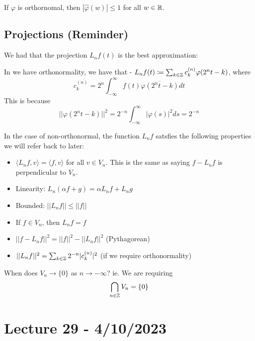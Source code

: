 \documentclass{article}
\begin{document}
{\begin{corollary}
    If $\varphi$ is orthornomal, then $|\widehat{\varphi}(w)| \leq 1$ for all $w \in \mathbb{R}$.
\end{corollary}

\subsection{Projections (Reminder)}

We had that the projection $L_n f(t)$ is the best approximation:

In we have orthonormality, we have that - $L_n f(t) \coloneqq \sum_{k \in \mathbb{Z}} c_k^{(n)} \varphi(2^n t - k)$, where
\[c_k^{(n)} = 2^n \int_{-\infty}^{\infty} f(t) \overline{\varphi(2^n t - k)} dt\]
This is because
\[||\varphi(2^n t - k)||^2 = 2^{-n} \int_{-\infty}^{\infty} |\varphi(s)|^2 ds = 2^{-n}\]

In the case of non-orthonormal, the function $L_n f$ satsfies the following properties we will refer back to later:
\begin{itemize}
    \item $\langle L_n f, v \rangle = \langle f, v \rangle$ for all $v \in V_n$. This is the same as saying $f - L_n f$ is perpendicular to $V_n$.
    \item Linearity: $L_n (\alpha f + g) = \alpha L_n f + L_n g$
    \item Bounded: $||L_n f|| \leq ||f||$
    \item If $f \in V_n$, then $L_n f = f$
    \item $||f - L_n f||^2 = ||f||^2 - ||L_n f||^2$ (Pythagorean)
    \item $||L_n f||^2 = \sum_{k \in \mathbb{Z}} 2^{-n} |c_k^{(n)}|^2$ (if we require orthonormality)
\end{itemize}

\begin{question}
   When does $V_n \to \{0\}$ as $n \to -\infty$? ie. We are requiring
   \[\bigcap_{n \in \mathbb{Z}} V_n = \{0\}\]
\end{question}

\newpage
\section{Lecture 29 - 4/10/2023}

}
\end{document}
